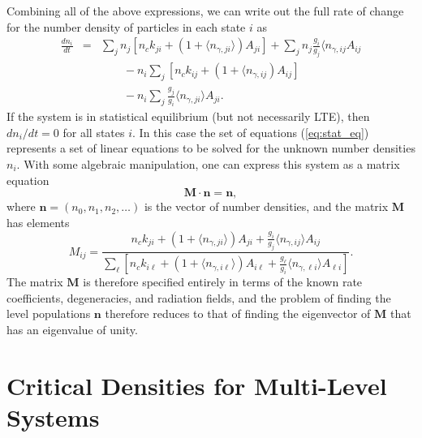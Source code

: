 Combining all of the above expressions, we can write out the full rate of change for the number density of particles in each state $i$ as
\begin{eqnarray}
\frac{dn_i}{dt} & = & \sum_j n_j\left[n_c k_{ji} + \left(1+\langle n_{\gamma,ji}\rangle\right) A_{ji}\right] +
 \sum_j n_j \frac{g_i}{g_j} \langle n_{\gamma,ij} A_{ij}
\nonumber \\
& & \qquad {} - n_i \sum_j \left[n_c k_{ij} + \left(1+\langle n_{\gamma,ij}\right) A_{ij}\right] 
\nonumber \\
& & \qquad {} -
 n_i \sum_j \frac{g_j}{g_i} \langle n_{\gamma,ji}\rangle A_{ji}.
\label{eq:stat_eq}
\end{eqnarray}
If the system is in statistical equilibrium (but not necessarily LTE), then $dn_i/dt = 0$ for all states $i$. In this case the set of equations (\ref{eq:stat_eq}) represents a set of linear equations to be solved for the unknown number densities $n_i$. With some algebraic manipulation, one can express this system as a matrix equation
\begin{equation}
\mathbf{M} \cdot \mathbf{n} = \mathbf{n},
\end{equation}
where $\mathbf{n} = (n_0, n_1, n_2, \ldots)$ is the vector of number densities, and the matrix $\mathbf{M}$ has elements
\begin{equation}
M_{ij} = \frac{n_c k_{ji} + \left(1 + \langle n_{\gamma,ji}\rangle\right) A_{ji} + \frac{g_i}{g_j} \langle n_{\gamma,ij}\rangle A_{ij}}
{ \sum_\ell \left[n_c k_{i\ell} + \left(1 + \langle n_{\gamma,i\ell}\rangle\right) A_{i\ell} + \frac{g_\ell}{g_i} \langle n_{\gamma,\ell i}\rangle A_{\ell i}\right] }.
\end{equation}
The matrix $\mathbf{M}$ is therefore specified entirely in terms of the known rate coefficients, degeneracies, and radiation fields, and the problem of finding the level populations $\mathbf{n}$ therefore reduces to that of finding the eigenvector of $\mathbf{M}$ that has an eigenvalue of unity.

\section{Critical Densities for Multi-Level Systems}

